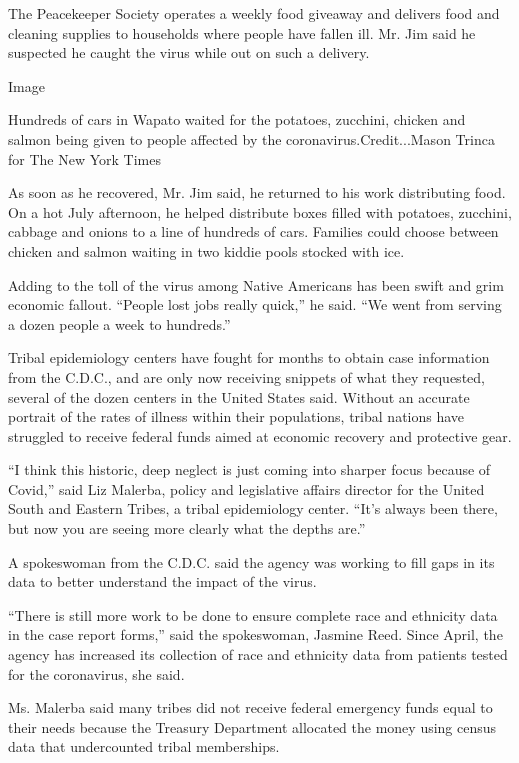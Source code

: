 The Peacekeeper Society operates a weekly food giveaway and delivers
food and cleaning supplies to households where people have fallen ill.
Mr. Jim said he suspected he caught the virus while out on such a
delivery.

Image

Hundreds of cars in Wapato waited for the potatoes, zucchini, chicken
and salmon being given to people affected by the
coronavirus.Credit...Mason Trinca for The New York Times

As soon as he recovered, Mr. Jim said, he returned to his work
distributing food. On a hot July afternoon, he helped distribute boxes
filled with potatoes, zucchini, cabbage and onions to a line of hundreds
of cars. Families could choose between chicken and salmon waiting in two
kiddie pools stocked with ice.

Adding to the toll of the virus among Native Americans has been swift
and grim economic fallout. ``People lost jobs really quick,'' he said.
``We went from serving a dozen people a week to hundreds.''

Tribal epidemiology centers have fought for months to obtain case
information from the C.D.C., and are only now receiving snippets of what
they requested, several of the dozen centers in the United States said.
Without an accurate portrait of the rates of illness within their
populations, tribal nations have struggled to receive federal funds
aimed at economic recovery and protective gear.

``I think this historic, deep neglect is just coming into sharper focus
because of Covid,'' said Liz Malerba, policy and legislative affairs
director for the United South and Eastern Tribes, a tribal epidemiology
center. ``It's always been there, but now you are seeing more clearly
what the depths are.''

A spokeswoman from the C.D.C. said the agency was working to fill gaps
in its data to better understand the impact of the virus.

``There is still more work to be done to ensure complete race and
ethnicity data in the case report forms,'' said the spokeswoman, Jasmine
Reed. Since April, the agency has increased its collection of race and
ethnicity data from patients tested for the coronavirus, she said.

Ms. Malerba said many tribes did not receive federal emergency funds
equal to their needs because the Treasury Department allocated the money
using census data that undercounted tribal memberships.

